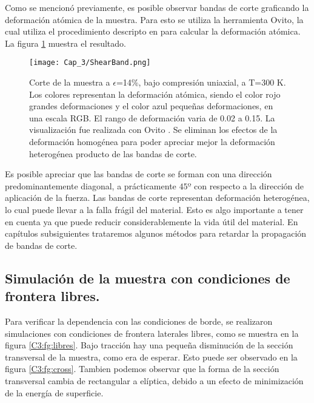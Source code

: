 Como se mencionó previamente, es posible observar bandas de corte graficando la deformación atómica de la muestra. Para esto se utiliza la herramienta Ovito, la cual utiliza el procedimiento descripto en \cite{shimizu07} para calcular la deformación atómica. La figura \ref{C3:fg:SBs} muestra el resultado.

\begin{figure}[htp]
\centering
\texttt{[image: Cap\_3/ShearBand.png]}
\caption[Corte de la muestra a $\epsilon$=14\%, bajo compresión uniaxial, a T=300 K.]{Corte de la muestra a $\epsilon$=14\%, bajo compresión uniaxial, a T=300 K. Los colores representan la deformación atómica, siendo el color rojo grandes deformaciones y el color azul pequeñas deformaciones, en una escala RGB. El rango de deformación varia de 0.02 a 0.15. La visualización fue realizada con Ovito \citep{stukowski10}. Se eliminan los efectos de la deformación homogénea para poder apreciar mejor la deformación heterogénea producto de las bandas de corte.}
\label{C3:fg:SBs}
\end{figure}

Es posible apreciar que las bandas de corte se forman con una dirección predominantemente diagonal, a prácticamente $45º$ con respecto a la dirección de aplicación de la fuerza. Las bandas de corte representan deformación heterogénea, lo cual puede llevar a la falla frágil del material. Esto es algo importante a tener en cuenta ya que puede reducir considerablemente la vida útil del material. En capítulos subsiguientes trataremos algunos métodos para retardar la propagación de bandas de corte.

\subsection{Simulación de la muestra con condiciones de frontera libres.}
\label{S3_3_2}

Para verificar la dependencia con las condiciones de borde, se realizaron simulaciones con condiciones de frontera laterales libres, como se muestra en la figura \ref{C3:fg:libres}. Bajo tracción hay una pequeña disminución de la sección transversal de la muestra, como era de esperar. Esto puede ser observado en la figura \ref{C3:fg:cross}. Tambien podemos observar que la forma de la sección transversal cambia de rectangular a elíptica, debido a un efecto de minimización de la energía de superficie.


